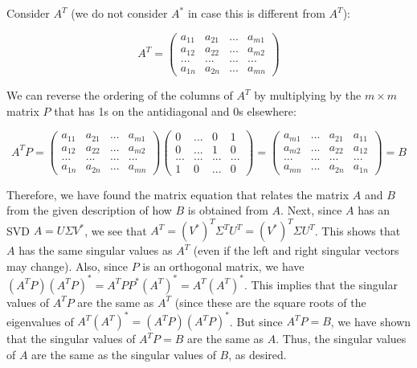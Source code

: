 \documentclass[11pt]{article}
\begin{document}
Consider $A^T$ (we do not consider $A^*$ in case this is different from $A^T$):

$$A^T = \begin{pmatrix}
a_{11} & a_{21} & ... & a_{m1} \\
a_{12} & a_{22} & ... & a_{m2} \\
... & ... & ... & ... \\
a_{1n} & a_{2n} & ... & a_{mn} \end{pmatrix}$$

We can reverse the ordering of the columns of $A^T$ by multiplying by the $m\times m$ matrix $P$ that has 1s on the antidiagonal and 0s elsewhere:

$$A^TP = \begin{pmatrix}
a_{11} & a_{21} & ... & a_{m1} \\
a_{12} & a_{22} & ... & a_{m2} \\
... & ... & ... & ... \\
a_{1n} & a_{2n} & ... & a_{mn} \end{pmatrix}
\begin{pmatrix}
0 &... & 0& 1\\
0& ... &1 & 0\\
... & ... & ... & ...\\
1 &0 & ... & 0
\end{pmatrix} = 
\begin{pmatrix}
a_{m1} & ... & a_{21} & a_{11} \\
a_{m2} & ... & a_{22} & a_{12} \\
... & ... & ... & ...\\
a_{mn} & ... & a_{2n} & a_{1n}
\end{pmatrix} = B
$$

Therefore, we have found the matrix equation that relates the matrix $A$ and $B$ from the given description of how $B$ is obtained from $A$. Next, since $A$ has an SVD $A = U\Sigma V^*$, we see that $A^T = (V^*)^T\Sigma^T U^T = (V^*)^T\Sigma U^T$. This shows that $A$ has the same singular values as $A^T$ (even if the left and right singular vectors may change). Also, since $P$ is an orthogonal matrix, we have $(A^TP)(A^TP)^* = A^TPP^*(A^T)^* = A^T(A^T)^*$. This implies that the singular values of $A^TP$ are the same as $A^T$ (since these are the square roots of the eigenvalues of $A^T(A^T)^* = (A^TP)(A^TP)^*$. But since $A^TP = B$, we have shown that the singular values of $A^TP=B$ are the same as $A$. Thus, the singular values of $A$ are the same as the singular values of $B$, as desired. 
\end{document}
